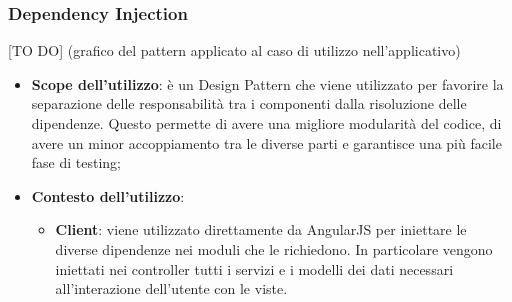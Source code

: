 	\subsubsection{Dependency Injection} %
	\label{ssub:dependency_injection}
	[TO DO] (grafico del pattern applicato al caso di utilizzo nell'applicativo)

		\begin{itemize}
			\item \textbf{Scope dell'utilizzo}: è un Design Pattern che viene utilizzato per favorire la separazione delle responsabilità tra i componenti dalla risoluzione delle dipendenze. Questo permette di avere una migliore modularità del codice, di avere un minor accoppiamento tra le diverse parti e garantisce una più facile fase di testing;
			\item \textbf{Contesto dell'utilizzo}: 
				\begin{itemize}
					\item \textbf{Client}: viene utilizzato direttamente da AngularJS per iniettare le diverse dipendenze nei moduli che le richiedono. In particolare vengono iniettati nei controller tutti i servizi e i modelli dei dati necessari all'interazione dell'utente con le viste.
				\end{itemize}
		\end{itemize}

